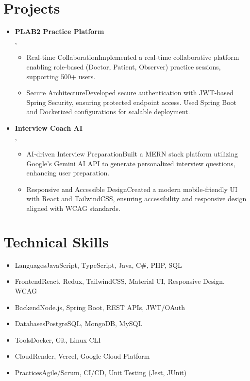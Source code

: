 \documentclass[letterpaper, 10pt]{article}
\newcommand{\resumeItem}[2]{\item{#1}#2\hfill}
\newcommand{\resumeSubheading}[4]{\vspace{2pt}\item[]\textbf{#1} \hfill #2 \\ \emph{#3}, #4}
\begin{document}
\section*{Projects}
\begin{itemize}[leftmargin=0.15in, label={}]
    \resumeSubheading{PLAB2 Practice Platform}{}{}{}
    \begin{itemize}
        \resumeItem{Real-time Collaboration}
        {Implemented a real-time collaborative platform enabling role-based (Doctor, Patient, Observer) practice sessions, supporting 500+ users.}
        \resumeItem{Secure Architecture}
        {Developed secure authentication with JWT-based Spring Security, ensuring protected endpoint access. Used Spring Boot and Dockerized configurations for scalable deployment.}
    \end{itemize}

    \resumeSubheading{Interview Coach AI}{}{}{}
    \begin{itemize}
        \resumeItem{AI-driven Interview Preparation}
        {Built a MERN stack platform utilizing Google's Gemini AI API to generate personalized interview questions, enhancing user preparation.}
        \resumeItem{Responsive and Accessible Design}
        {Created a modern mobile-friendly UI with React and TailwindCSS, ensuring accessibility and responsive design aligned with WCAG standards.}
    \end{itemize}
\end{itemize}

\section*{Technical Skills}
\begin{itemize}[leftmargin=0.15in, label={}]
    \resumeItem{Languages}{JavaScript, TypeScript, Java, C\#, PHP, SQL}
    \resumeItem{Frontend}{React, Redux, TailwindCSS, Material UI, Responsive Design, WCAG}
    \resumeItem{Backend}{Node.js, Spring Boot, REST APIs, JWT/OAuth}
    \resumeItem{Databases}{PostgreSQL, MongoDB, MySQL}
    \resumeItem{Tools}{Docker, Git, Linux CLI}
    \resumeItem{Cloud}{Render, Vercel, Google Cloud Platform}
    \resumeItem{Practices}{Agile/Scrum, CI/CD, Unit Testing (Jest, JUnit)}
\end{itemize}
\end{document}
